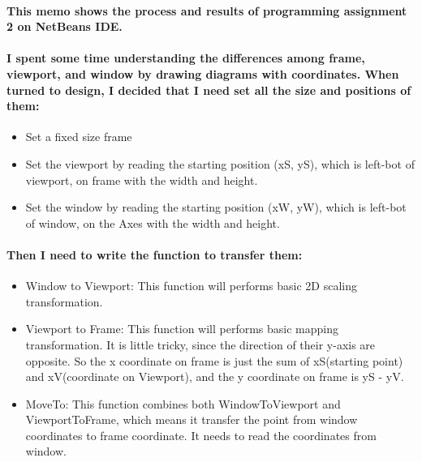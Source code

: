 \documentclass[a4paper,12pt]{texMemo}
\begin{document}
\maketitle


\paragraph{This memo shows the process and results of programming assignment 2 on NetBeans IDE.}

\paragraph{I spent some time understanding the differences among frame, viewport, and window by drawing diagrams with coordinates. When turned to design, I decided that I need set all the size and positions of them:  }
\begin{itemize}
	\item Set a fixed size frame
	\item Set the viewport by reading the starting position (xS, yS), which is left-bot of viewport, on frame with the width and height.
	\item Set the window by reading the starting position (xW, yW), which is left-bot of window, on the Axes with the width and height.
\end{itemize}

\paragraph{Then I need to write the function to transfer them:}
\begin{itemize}
	\item Window to Viewport: This function will performs basic 2D scaling transformation.
	\item Viewport to Frame: This function will performs basic mapping transformation. It is little tricky, since the direction of their y-axis are opposite. So the x coordinate on frame is just the sum of xS(starting point) and xV(coordinate on Viewport), and the y coordinate on frame is yS - yV.
	\item MoveTo: This function combines both WindowToViewport and ViewportToFrame, which means it transfer the point from window coordinates to frame coordinate. It needs to read the coordinates from window.
\end{itemize}
\end{document}
